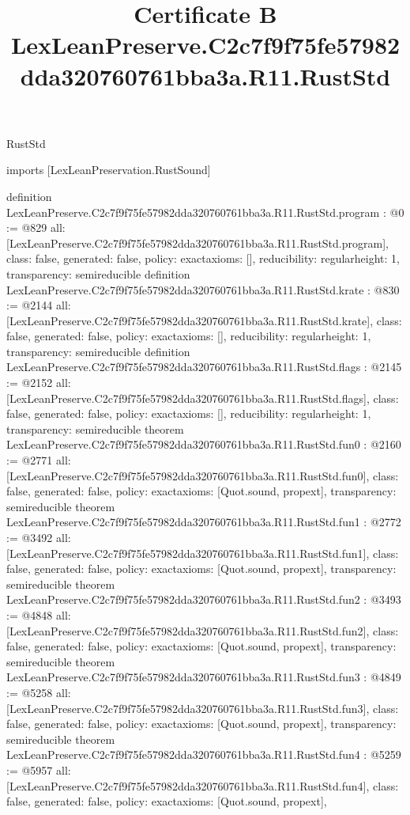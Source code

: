 \begin{lexlean}{RustStd}
\title{Certificate B LexLeanPreserve.C2c7f9f75fe57982dda320760761bba3a.R11.RustStd}
\begin{coremodule}
imports [LexLeanPreservation.RustSound]

definition LexLeanPreserve.C2c7f9f75fe57982dda320760761bba3a.R11.RustStd.program : @0 := @829 {
  all: [LexLeanPreserve.C2c7f9f75fe57982dda320760761bba3a.R11.RustStd.program],
  class: false,
  generated: false,
  policy: exact{axioms: []},
  reducibility: regular{height: 1},
  transparency: semireducible
}
definition LexLeanPreserve.C2c7f9f75fe57982dda320760761bba3a.R11.RustStd.krate : @830 := @2144 {
  all: [LexLeanPreserve.C2c7f9f75fe57982dda320760761bba3a.R11.RustStd.krate],
  class: false,
  generated: false,
  policy: exact{axioms: []},
  reducibility: regular{height: 1},
  transparency: semireducible
}
definition LexLeanPreserve.C2c7f9f75fe57982dda320760761bba3a.R11.RustStd.flags : @2145 := @2152 {
  all: [LexLeanPreserve.C2c7f9f75fe57982dda320760761bba3a.R11.RustStd.flags],
  class: false,
  generated: false,
  policy: exact{axioms: []},
  reducibility: regular{height: 1},
  transparency: semireducible
}
theorem LexLeanPreserve.C2c7f9f75fe57982dda320760761bba3a.R11.RustStd.fun0 : @2160 := @2771 {
  all: [LexLeanPreserve.C2c7f9f75fe57982dda320760761bba3a.R11.RustStd.fun0],
  class: false,
  generated: false,
  policy: exact{axioms: [Quot.sound, propext]},
  transparency: semireducible
}
theorem LexLeanPreserve.C2c7f9f75fe57982dda320760761bba3a.R11.RustStd.fun1 : @2772 := @3492 {
  all: [LexLeanPreserve.C2c7f9f75fe57982dda320760761bba3a.R11.RustStd.fun1],
  class: false,
  generated: false,
  policy: exact{axioms: [Quot.sound, propext]},
  transparency: semireducible
}
theorem LexLeanPreserve.C2c7f9f75fe57982dda320760761bba3a.R11.RustStd.fun2 : @3493 := @4848 {
  all: [LexLeanPreserve.C2c7f9f75fe57982dda320760761bba3a.R11.RustStd.fun2],
  class: false,
  generated: false,
  policy: exact{axioms: [Quot.sound, propext]},
  transparency: semireducible
}
theorem LexLeanPreserve.C2c7f9f75fe57982dda320760761bba3a.R11.RustStd.fun3 : @4849 := @5258 {
  all: [LexLeanPreserve.C2c7f9f75fe57982dda320760761bba3a.R11.RustStd.fun3],
  class: false,
  generated: false,
  policy: exact{axioms: [Quot.sound, propext]},
  transparency: semireducible
}
theorem LexLeanPreserve.C2c7f9f75fe57982dda320760761bba3a.R11.RustStd.fun4 : @5259 := @5957 {
  all: [LexLeanPreserve.C2c7f9f75fe57982dda320760761bba3a.R11.RustStd.fun4],
  class: false,
  generated: false,
  policy: exact{axioms: [Quot.sound, propext]},
}
\end{coremodule}
\end{lexlean}
